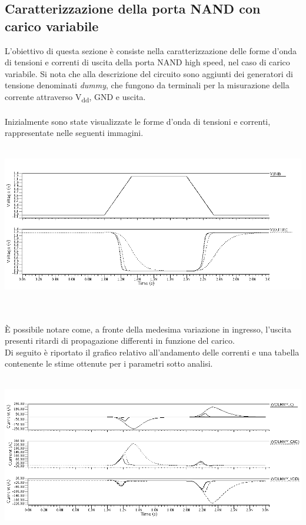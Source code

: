 \documentclass[11pt,  english, makeidx, a4paper, titlepage, oneside]{book}
\begin{document}
\subsection{Caratterizzazione della porta NAND con carico variabile}
L'obiettivo di questa sezione è consiste nella caratterizzazione delle forme d'onda di tensioni e correnti di uscita della porta NAND high speed, nel caso di carico variabile. Si nota che alla descrizione del circuito sono aggiunti dei generatori di tensione denominati \textit{dummy}, che fungono da terminali per la misurazione della corrente attraverso V\textsubscript{dd}, GND e uscita.
\\\\
Inizialmente sono state visualizzate le forme d'onda di tensioni e correnti, rappresentate nelle seguenti immagini.
\\\\
\centerline{\includegraphics[width=14cm]{./img/Lab_5/waveform_2.png}}
\\\\
È possibile notare come, a fronte della medesima variazione in ingresso, l'uscita presenti ritardi di propagazione differenti in funzione del carico.
\\
Di seguito è riportato il grafico relativo all'andamento delle correnti e una tabella contenente le stime ottenute per i parametri sotto analisi.
\\\\
\centerline{\includegraphics[width=14cm]{./img/Lab_5/waveform_3.png}}
\end{document}
